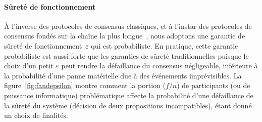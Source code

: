 \documentclass[letterpaper,twocolumn,10pt]{article}
\theoremstyle{definition}
\begin{document}
\paragraph{Sûreté de fonctionnement} À l'inverse des protocoles de consensus classiques, et à l'instar des protocoles de consensus fondés sur la chaîne la plus longue~\cite{nakamoto2008bitcoin}, nous adoptons une garantie de sûreté de fonctionnement~$\varepsilon$ qui est probabiliste.
En pratique, cette garantie probabiliste est aussi forte que les garanties de sûreté traditionnelles puisque le choix d'un petit $\varepsilon$ peut rendre la défaillance du consensus négligeable, inférieure à la probabilité d'une panne matérielle due à des événements imprévisibles.
La figure~\ref{fig:fandepsilon} montre comment la portion ($f/n$) de participants (ou de puissance informatique) problématique affecte la probabilité d'une défaillance de la sûreté du système (décision de deux propositions incompatibles), étant donné un choix de finalités.
\end{document}
